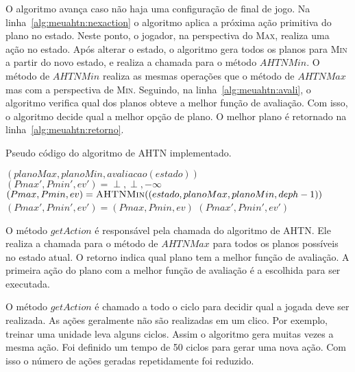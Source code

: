 O algoritmo avança caso não haja uma configuração de final de jogo.
Na linha~\ref{alg:meuahtn:nexaction} o algoritmo aplica a próxima ação primitiva do plano no estado.
Neste ponto, o jogador, na perspectiva do \textsc{Max}, realiza uma ação no estado.
Após alterar o estado, o algoritmo gera todos os planos para \textsc{Min} a partir do novo estado, e realiza a chamada para o método $\mathit{AHTNMin}$.
O método de $\mathit{AHTNMin}$ realiza as mesmas operações que o método de $\mathit{AHTNMax}$ mas com a perspectiva de \textsc{Min}.
Seguindo, na linha~\ref{alg:meuahtn:avali}, o algoritmo verifica qual dos planos obteve a melhor função de avaliação. 
Com isso, o algoritmo decide qual a melhor opção de plano.
O melhor plano é retornado na linha~\ref{alg:meuahtn:retorno}.


\begin{algorithm}[ht]
	\caption{Pseudo código do algoritmo de AHTN implementado.}
	\label{alg:meuahtn}
 	\begin{algorithmic}[1]		
	 		 \label{alg:meuahtn:terminal}
		 		\State	\Return $(planoMax, planoMin, avaliacao(estado))$
	 		\EndIf
	 		 \label{alg:meuahtn:nexaction}
	 		\State $(Pmax', Pmin', ev') = \perp, \perp, -\infty$
			 \label{alg:meuahtn:for}
		 		\State $(Pmax, Pmin, ev) = \Call{AHTNMin}{(estado, planoMax, planoMin, deph-1)}$ \label{alg:meuahtn:ahtnmin}
			 	 \label{alg:meuahtn:avali}
					\State $(Pmax', Pmin', ev') = (Pmax, Pmin, ev)$
				\EndIf		 		 		
		 	\EndFor
		 	\State \Return $(Pmax', Pmin', ev')$ \label{alg:meuahtn:retorno}
 		\EndFunction
 	\end{algorithmic}
 \end{algorithm}
 
 
O método $\mathit{getAction}$ é responsável pela chamada do algoritmo de AHTN. 
Ele realiza a chamada para o método de $\mathit{AHTNMax}$ para todos os planos possíveis no estado atual.
O retorno indica qual plano tem a melhor função de avaliação.
A primeira ação do plano com a melhor função de avaliação é a escolhida para ser executada. 

O método $\mathit{getAction}$ é chamado a todo o ciclo para decidir qual a jogada deve ser realizada.
As ações geralmente não são realizadas em um clico.
Por exemplo, treinar uma unidade leva alguns ciclos.
Assim o algoritmo gera muitas vezes a mesma ação.
Foi definido um tempo de 50 ciclos para gerar uma nova ação.
Com isso o número de ações geradas repetidamente foi reduzido.

